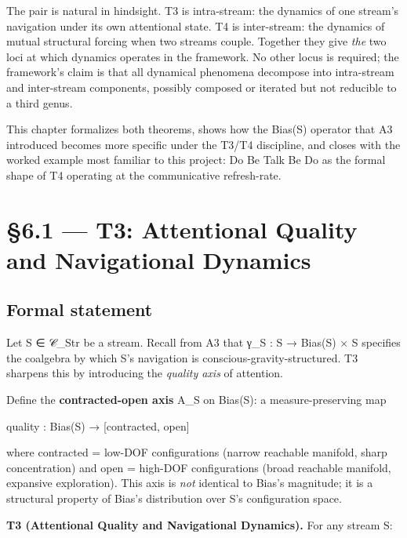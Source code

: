 \documentclass[11pt, openany]{book}
\newcommand{\sectionbreak}{\clearpage}
\begin{document}
The pair is natural in hindsight. T3 is intra-stream: the dynamics of one stream's navigation under its own attentional state. T4 is inter-stream: the dynamics of mutual structural forcing when two streams couple. Together they give \textit{the} two loci at which dynamics operates in the framework. No other locus is required; the framework's claim is that all dynamical phenomena decompose into intra-stream and inter-stream components, possibly composed or iterated but not reducible to a third genus.

This chapter formalizes both theorems, shows how the Bias(S) operator that A3 introduced becomes more specific under the T3/T4 discipline, and closes with the worked example most familiar to this project: Do Be Talk Be Do as the formal shape of T4 operating at the communicative refresh-rate.

\sectionbreak

\section{§6.1 --- T3: Attentional Quality and Navigational Dynamics}

\subsection{Formal statement}

Let S ∈ 𝒞\_\allowbreak{}Str be a stream. Recall from A3 that γ\_\allowbreak{}S : S → Bias(S) × S specifies the coalgebra by which S's navigation is conscious-gravity-structured. T3 sharpens this by introducing the \textit{quality axis} of attention.

Define the \textbf{contracted-open axis} A\_\allowbreak{}S on Bias(S): a measure-preserving map

\begin{Code}
quality : Bias(S) → [contracted, open]
\end{Code}

where contracted = low-DOF configurations (narrow reachable manifold, sharp concentration) and open = high-DOF configurations (broad reachable manifold, expansive exploration). This axis is \textit{not} identical to Bias's magnitude; it is a structural property of Bias's distribution over S's configuration space.

\textbf{T3 (Attentional Quality and Navigational Dynamics).} For any stream S:
\end{document}
